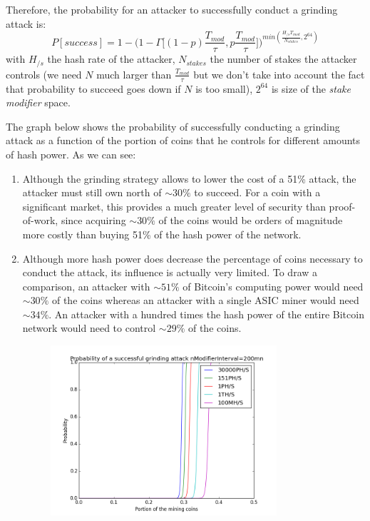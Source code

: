 \documentclass[a4paper,11pt]{article}
\begin{document}
Therefore, the probability for an attacker to successfully conduct a grinding attack is:
$$P[success]=1-\bigg(1- \Gamma\Big[(1-p)\frac{T_{mod}}{\tau},p\frac{T_{mod}}{\tau}\Big]\bigg)^{min( \frac{ H_{/s}T_{mod} }{N_{stakes}},2^{64}) }$$
with $H_{/s}$ the hash rate of the attacker, $N_{stakes}$ the number of stakes the attacker controls (we need $N$ much larger than $\frac{T_{mod}}{\tau}$ but we don't take into account the fact that probability to succeed goes down if $N$ is too small), $2^{64}$ is size of the \textit{stake modifier} space.

The graph below shows the probability of successfully conducting a grinding attack as a function of the portion of coins that he controls for different amounts of hash power.
As we can see:
\begin{enumerate}
\setlength{\itemsep}{0pt}
\item{Although the grinding strategy allows to lower the cost of a 51\% attack, the attacker must still own north of $\sim30\%$ to succeed. For a coin with a significant market, this provides a much greater level of security than proof-of-work, since acquiring $\sim30\%$ of the coins would be orders of magnitude more costly than buying 51\% of the hash power of the network.}
\item{Although more hash power does decrease the percentage of coins necessary to conduct the attack, its influence is actually very limited. To draw a comparison, an attacker with $\sim51\%$ of Bitcoin's computing power would need $\sim30\%$ of the coins whereas an attacker with a single ASIC miner would need $\sim34\%$. An attacker with a hundred times the hash power of the entire Bitcoin network would need to control $\sim29\%$ of the coins.}
\end{enumerate}


\begin{figure}[H]
\centering
\includegraphics[width=96mm,height=63mm]{07_NC_200min.png}
\caption{}
\end{figure}
\end{document}
